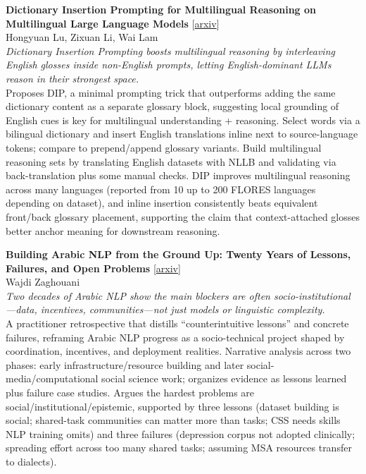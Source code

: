 \documentclass[12pt,letterpaper]{article}
\begin{document}
{\small\textbf{Dictionary Insertion Prompting for Multilingual Reasoning on Multilingual Large Language Models}} {\scriptsize[\href{https://arxiv.org/abs/2411.01141}{arxiv}]}\\
{\scriptsize Hongyuan Lu, Zixuan Li, Wai Lam}\\

{\small\textit{Dictionary Insertion Prompting boosts multilingual reasoning by interleaving English glosses inside non-English prompts, letting English-dominant LLMs reason in their strongest space.}}\\[1pt]
{\footnotesize Proposes DIP, a minimal prompting trick that outperforms adding the same dictionary content as a separate glossary block, suggesting local grounding of English cues is key for multilingual understanding + reasoning. Select words via a bilingual dictionary and insert English translations inline next to source-language tokens; compare to prepend/append glossary variants. Build multilingual reasoning sets by translating English datasets with NLLB and validating via back-translation plus some manual checks. DIP improves multilingual reasoning across many languages (reported from 10 up to 200 FLORES languages depending on dataset), and inline insertion consistently beats equivalent front/back glossary placement, supporting the claim that context-attached glosses better anchor meaning for downstream reasoning.}

\medskip

{\small\textbf{Building Arabic NLP from the Ground Up: Twenty Years of Lessons, Failures, and Open Problems}} {\scriptsize[\href{https://arxiv.org/abs/2605.20786}{arxiv}]}\\
{\scriptsize Wajdi Zaghouani}\\

{\small\textit{Two decades of Arabic NLP show the main blockers are often socio-institutional---data, incentives, communities---not just models or linguistic complexity.}}\\[1pt]
{\footnotesize A practitioner retrospective that distills ``counterintuitive lessons'' and concrete failures, reframing Arabic NLP progress as a socio-technical project shaped by coordination, incentives, and deployment realities. Narrative analysis across two phases: early infrastructure/resource building and later social-media/computational social science work; organizes evidence as lessons learned plus failure case studies. Argues the hardest problems are social/institutional/epistemic, supported by three lessons (dataset building is social; shared-task communities can matter more than tasks; CSS needs skills NLP training omits) and three failures (depression corpus not adopted clinically; spreading effort across too many shared tasks; assuming MSA resources transfer to dialects).}
\end{document}
